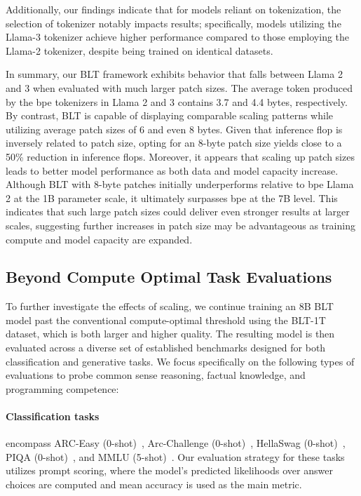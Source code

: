 Additionally, our findings indicate that for models reliant on tokenization, the selection of tokenizer notably impacts results; specifically, models utilizing the Llama-3 tokenizer achieve higher performance compared to those employing the Llama-2 tokenizer, despite being trained on identical datasets.

In summary, our {\textsc BLT} framework exhibits behavior that falls between Llama 2 and 3 when evaluated with much larger patch sizes. The average token produced by the bpe tokenizers in Llama 2 and 3 contains 3.7 and 4.4 bytes, respectively. By contrast, {\textsc BLT} is capable of displaying comparable scaling patterns while utilizing average patch sizes of 6 and even 8 bytes. Given that inference flop is inversely related to patch size, opting for an 8-byte patch size yields close to a 50\% reduction in inference flops. Moreover, it appears that scaling up patch sizes leads to better model performance as both data and model capacity increase. Although {\textsc BLT} with 8-byte patches initially underperforms relative to bpe Llama 2 at the 1B parameter scale, it ultimately surpasses bpe at the 7B level. This indicates that such large patch sizes could deliver even stronger results at larger scales, suggesting further increases in patch size may be advantageous as training compute and model capacity are expanded.

\subsection{Beyond Compute Optimal Task Evaluations}
\label{section:evals}
To further investigate the effects of scaling, we continue training an 8B {\textsc BLT} model past the conventional compute-optimal threshold using the {\textsc BLT}-1T dataset, which is both larger and higher quality. The resulting model is then evaluated across a diverse set of established benchmarks designed for both classification and generative tasks. We focus specifically on the following types of evaluations to probe common sense reasoning, factual knowledge, and programming competence:
\paragraph{Classification tasks} encompass ARC-Easy (0-shot)~\citep{Eval_ARC}, Arc-Challenge (0-shot)~\citep{Eval_ARC}, HellaSwag (0-shot)~\citep{Eval_hellaswag}, PIQA (0-shot)~\citep{Eval_piqa}, and MMLU (5-shot)~\citep{hendrycks2020measuring}. Our evaluation strategy for these tasks utilizes prompt scoring, where the model’s predicted likelihoods over answer choices are computed and mean accuracy is used as the main metric.
